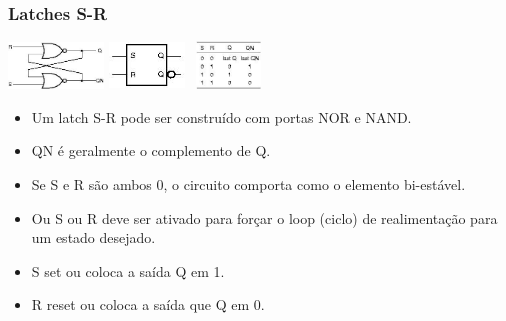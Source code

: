 \documentclass{beamer}
\begin{document}
\begin{frame}
  \frametitle{Latches S-R}
 \begin{center}
  \includegraphics[height = 0.5in, width = 1in]{slide17_filomeno} 
  \includegraphics[height = 0.5in, width = 0.8in]{slide17_filomeno2} 
  \includegraphics[height = 0.5in, width = 0.8in]{slide17_filomeno3} 
 \end{center}
 \begin{itemize}
  \item Um latch S-R pode ser construído com portas NOR e NAND.\pause
  \item QN é geralmente o complemento de Q.\pause
  \item Se S e R são ambos 0, o circuito comporta como o elemento bi-estável.\pause
  \item Ou S ou R deve ser ativado para forçar o loop (ciclo) de realimentação para um estado desejado.\pause
  \item S set ou coloca a saída Q em 1.\pause
  \item R reset ou coloca a saída que Q em 0.
 \end{itemize}
\end{frame}
\end{document}
